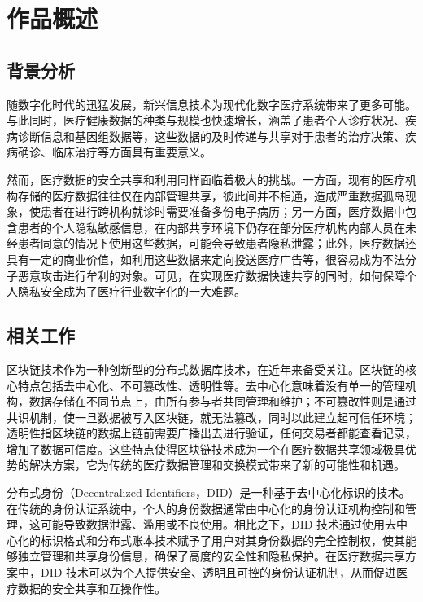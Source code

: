 \documentclass{cumcmthesis}
\numberwithin{equation}{section} %
\numberwithin{figure}{section} %
\numberwithin{table}{section} %
\begin{document}
\begin{enabstract}


\end{enabstract}

\section{作品概述}

\subsection{背景分析}

随数字化时代的迅猛发展，新兴信息技术为现代化数字医疗系统带来了更多可能。与此同时，医疗健康数据的种类与规模也快速增长，涵盖了患者个人诊疗状况、疾病诊断信息和基因组数据等，这些数据的及时传递与共享对于患者的治疗决策、疾病确诊、临床治疗等方面具有重要意义。

然而，医疗数据的安全共享和利用同样面临着极大的挑战。一方面，现有的医疗机构存储的医疗数据往往仅在内部管理共享，彼此间并不相通，造成严重数据孤岛现象，使患者在进行跨机构就诊时需要准备多份电子病历；另一方面，医疗数据中包含患者的个人隐私敏感信息，在内部共享环境下仍存在部分医疗机构内部人员在未经患者同意的情况下使用这些数据，可能会导致患者隐私泄露；此外，医疗数据还具有一定的商业价值，如利用这些数据来定向投送医疗广告等，很容易成为不法分子恶意攻击进行牟利的对象。可见，在实现医疗数据快速共享的同时，如何保障个人隐私安全成为了医疗行业数字化的一大难题。

\subsection{相关工作}

区块链技术作为一种创新型的分布式数据库技术，在近年来备受关注。区块链的核心特点包括去中心化、不可篡改性、透明性等\cite{ref1}。去中心化意味着没有单一的管理机构，数据存储在不同节点上，由所有参与者共同管理和维护；不可篡改性则是通过共识机制，使一旦数据被写入区块链，就无法篡改，同时以此建立起可信任环境；透明性指区块链的数据上链前需要广播出去进行验证，任何交易者都能查看记录，增加了数据可信度。这些特点使得区块链技术成为一个在医疗数据共享领域极具优势的解决方案，它为传统的医疗数据管理和交换模式带来了新的可能性和机遇。

分布式身份（Decentralized Identifiers，DID）是一种基于去中心化标识的技术。在传统的身份认证系统中，个人的身份数据通常由中心化的身份认证机构控制和管理，这可能导致数据泄露、滥用或不良使用。相比之下，DID 技术通过使用去中心化的标识格式和分布式账本技术赋予了用户对其身份数据的完全控制权，使其能够独立管理和共享身份信息，确保了高度的安全性和隐私保护。在医疗数据共享方案中，DID 技术可以为个人提供安全、透明且可控的身份认证机制，从而促进医疗数据的安全共享和互操作性。
\end{document}
